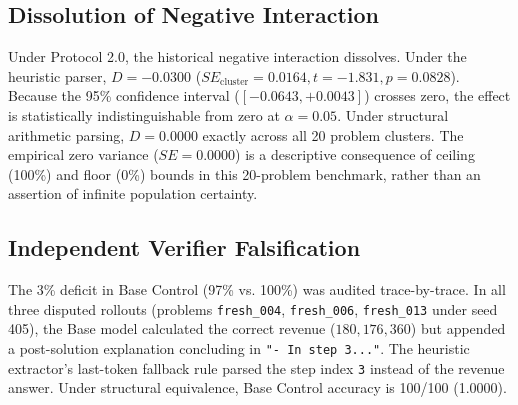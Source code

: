 \documentclass[10pt,conference]{IEEEtran}
\begin{document}
\begin{table}[htbp]
\caption{Protocol 2.0 Factorial Outcomes ($N=400$ Rollouts, $C=20$ Clusters)}
\label{tab:outcomes}
\centering
{}
\end{table}

\subsection{Dissolution of Negative Interaction}
Under Protocol 2.0, the historical negative interaction dissolves. Under the heuristic parser, $D = -0.0300$ ($SE_{\text{cluster}} = 0.0164, t = -1.831, p = 0.0828$). Because the 95\% confidence interval ($[-0.0643, +0.0043]$) crosses zero, the effect is statistically indistinguishable from zero at $\alpha = 0.05$. Under structural arithmetic parsing, $D = 0.0000$ exactly across all 20 problem clusters. The empirical zero variance ($SE = 0.0000$) is a descriptive consequence of ceiling (100\%) and floor (0\%) bounds in this 20-problem benchmark, rather than an assertion of infinite population certainty.

\subsection{Independent Verifier Falsification}
The 3\% deficit in Base Control (97\% vs. 100\%) was audited trace-by-trace. In all three disputed rollouts (problems \texttt{fresh\_004}, \texttt{fresh\_006}, \texttt{fresh\_013} under seed 405), the Base model calculated the correct revenue ($180, 176, 360$) but appended a post-solution explanation concluding in \texttt{"- In step 3..."}. The heuristic extractor's last-token fallback rule parsed the step index \texttt{3} instead of the revenue answer. Under structural equivalence, Base Control accuracy is 100/100 (1.0000).
\end{document}
